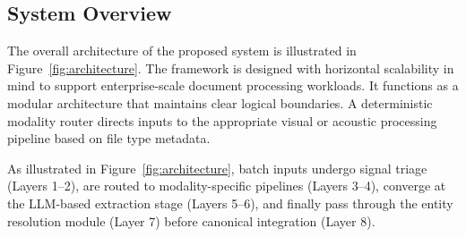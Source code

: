 \subsection{System Overview}
The overall architecture of the proposed system is illustrated in Figure~\ref{fig:architecture}. The framework is designed with horizontal scalability in mind to support enterprise-scale document processing workloads. It functions as a modular architecture that maintains clear logical boundaries. A deterministic modality router directs inputs to the appropriate visual or acoustic processing pipeline based on file type metadata.

As illustrated in Figure~\ref{fig:architecture}, batch inputs undergo signal triage (Layers 1--2), are routed to modality-specific pipelines (Layers 3--4), converge at the LLM-based extraction stage (Layers 5--6), and finally pass through the entity resolution module (Layer 7) before canonical integration (Layer 8).


